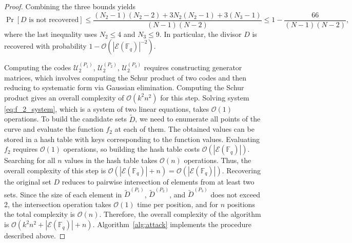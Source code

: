\documentclass[sn-mathphys-num]{sn-jnl_modified}
\newcommand{\FF}{\ensuremath{\mathbb{F}}}
\begin{document}
\begin{proof}
Combining the three bounds yields
\[
\Pr\left[D\text{ is not recovered}\right]
\leq
\frac{(N_2-1)(N_2-2)
      +3N_2(N_2-1)
      +3(N_3-1)}
     {(N-1)(N-2)} \leq 1 - \frac{66}{(N-1)(N-2)},
\]
where the last inequality uses $N_2 \leq 4$ and $N_3 \leq 9$. In particular, the divisor $D$ is recovered with probability $1 - \mathcal{O}(|\mathcal{E}(\FF_q)|^{-2})$.



Computing the codes $\mathcal{U}_2^{(P_1)}$, $\mathcal{U}_2^{(P_2)}$, $\mathcal{U}_2^{(P_3)}$ requires constructing generator matrices, which involves computing the Schur product of two codes and then reducing to systematic form via Gaussian elimination. Computing the Schur product gives an overall complexity of $\mathcal{O}(k^2n^2)$  for this step. Solving system \eqref{eq:f_2_system}, which is a system of two linear equations, takes $\mathcal{O}(1)$ operations. To build the candidate sets $\widetilde{D}$, we need to enumerate all points of the curve and evaluate the function $f_2$ at each of them. The obtained values can be stored in a hash table with keys corresponding to the function values. Evaluating $f_2$ requires $\mathcal{O}(1)$ operations, so building the hash table costs $\mathcal{O}(|\mathcal{E}(\mathbb{F}_q)|)$. Searching for all $n$ values in the hash table takes $\mathcal{O}(n)$ operations. Thus, the overall complexity of this step is $\mathcal{O}(|\mathcal{E}(\mathbb{F}_q)| + n) = \mathcal{O}(|\mathcal{E}(\mathbb{F}_q)|)$. Recovering the original set $D$ reduces to pairwise intersection of elements from at least two sets. Since the size of each element in $\widetilde{D}^{(P_1)}$, $\widetilde{D}^{(P_2)}$, and $\widetilde{D}^{(P_3)}$ does not exceed 2, the intersection operation takes $\mathcal{O}(1)$ time per position, and for $n$ positions the total complexity is $\mathcal{O}(n)$. Therefore, the overall complexity of the algorithm is $\mathcal{O}\!\left(k^2n^2 + |\mathcal{E}(\mathbb{F}_q)| + n\right)$. Algorithm~\ref{alg:attack} implements the procedure described above.
\end{proof}
\end{document}
